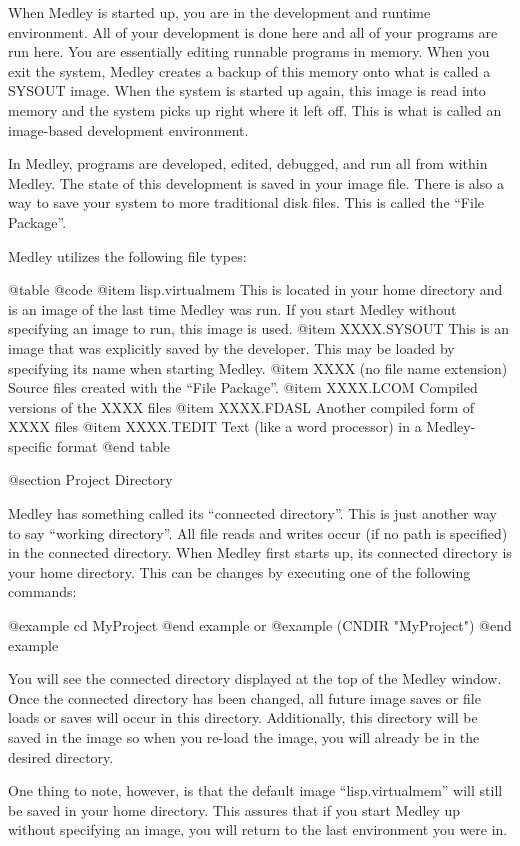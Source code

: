 When Medley is started up, you are in the development and runtime
environment.  All of your development is done here and all of your
programs are run here.  You are essentially editing runnable programs
in memory.  When you exit the system, Medley creates a backup of this
memory onto what is called a SYSOUT image.  When the system is started
up again, this image is read into memory and the system picks up right
where it left off.  This is what is called an image-based development
environment.

In Medley, programs are developed, edited, debugged, and run all from
within Medley.  The state of this development is saved in your image file.
There is also a way to save your system to more traditional
disk files.  This is called the ``File Package''.

Medley utilizes the following file types:

@table @code
@item lisp.virtualmem
This is located in your home directory and is an image of the last
time Medley was run.  If you start Medley without specifying an image to run, 
this image is used.
@item XXXX.SYSOUT
This is an image that was explicitly saved by the developer.  This may
be loaded by specifying its name when starting Medley.
@item XXXX (no file name extension)
Source files created with the ``File Package''.
@item XXXX.LCOM
Compiled versions of the XXXX files
@item XXXX.FDASL
Another compiled form of XXXX files
@item XXXX.TEDIT
Text (like a word processor) in a Medley-specific format
@end table

@section Project Directory

Medley has something called its ``connected directory''.  This is just
another way to say ``working directory''.  All file reads and writes
occur (if no path is specified) in the connected directory.  When Medley
first starts up, its connected directory is your home directory.  This
can be changes by executing one of the following commands:

@example
cd MyProject
@end example
or
@example
(CNDIR "MyProject")
@end example

You will see the connected directory displayed at the top of the Medley
window.  Once the connected directory has been changed, all future
image saves or file loads or saves will occur in this directory.  Additionally,
this directory will be saved in the image so when you re-load the image, you 
will already be in the desired directory.

One thing to note, however, is that the default image
``lisp.virtualmem'' will still be saved in your home directory.  This
assures that if you start Medley up without specifying an image, you
will return to the last environment you were in.


